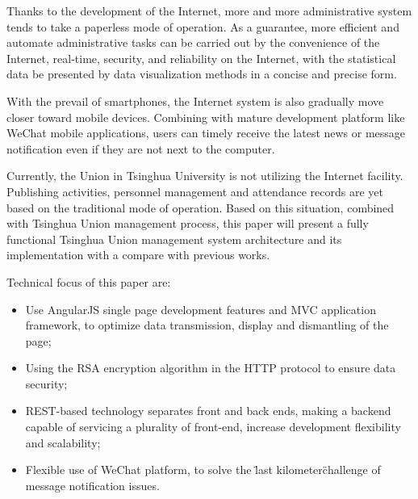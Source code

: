 \begin{eabstract}
   
  Thanks to the development of the Internet, more and more administrative system tends to take a paperless mode of operation. As a guarantee, more efficient and automate administrative tasks can be carried out by the convenience of the Internet, real-time, security, and reliability on the Internet, with the statistical data be presented by data visualization methods in a concise and precise form.

  With the prevail of smartphones, the Internet system is also gradually move closer toward mobile devices. Combining with mature development platform like WeChat mobile applications, users can timely receive the latest news or message notification even if they are not next to the computer.

  Currently, the Union in Tsinghua University is not utilizing the Internet facility. Publishing activities, personnel management and attendance records are yet based on the traditional mode of operation. Based on this situation, combined with Tsinghua Union management process, this paper will present a fully functional Tsinghua Union management system architecture and its implementation with a compare with previous works.

  Technical focus of this paper are:  
\begin{itemize}
    \item Use AngularJS single page development features and MVC application framework, to optimize data transmission, display and dismantling of the page;
    \item Using the RSA encryption algorithm in the HTTP protocol to ensure data security;
    \item REST-based technology separates front and back ends, making a backend capable of servicing a plurality of front-end, increase development flexibility and scalability;
    \item Flexible use of WeChat platform, to solve the \"last kilometer\" challenge of message notification issues.
\end{itemize}


\end{eabstract}

